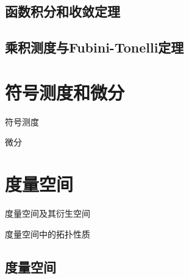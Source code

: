 \documentclass[lang=cn,10pt]{elegantbook}
\begin{document}
	\section{函数积分和收敛定理}

	\section{乘积测度与Fubini-Tonelli定理}

	\chapter{符号测度和微分}
	\begin{introduction}
		\item 符号测度
		\item 微分
	\end{introduction}
	
	\chapter{度量空间}
	\begin{introduction}
		\item 度量空间及其衍生空间
		\item 度量空间中的拓扑性质
	\end{introduction}
	
	\section{度量空间}
	
\end{document}
